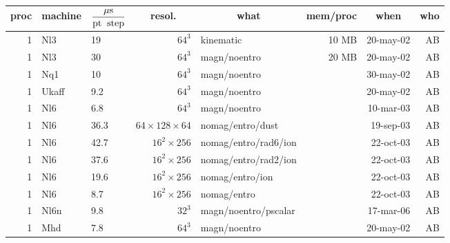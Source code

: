 \documentclass[\mydriver,12pt,twoside,notitlepage,a4paper]{article}
\newcommand{\mcc}[1]{\multicolumn{1}{c}{#1}}
\begin{document}
\begin{center}
    \begin{footnotesize}
    \begin{longtable}{rllrlrrr}
    \toprule
   \mcc{proc}
     & \mcc{machine}
             & \mcc{$\displaystyle\frac{{\mu\rm s}}{\rm pt\;\;step}$}
                    & \mcc{resol.}
                              & \mcc{what}
                                             & \mcc{mem/proc}
                                                      & \mcc{when}&\mcc{who}\\
    \midrule
   1 & Nl3   &  19  &  $64^3$ & kinematic    &  10 MB & 20-may-02 & AB \\
   1 & Nl3   &  30  &  $64^3$ & magn/noentro &  20 MB & 20-may-02 & AB \\
   1 & Nq1   &  10  &  $64^3$ & magn/noentro &        & 30-may-02 & AB \\
   1 & Ukaff & 9.2  &  $64^3$ & magn/noentro &        & 20-may-02 & AB \\
   1 & Nl6   & 6.8  &  $64^3$ & magn/noentro &        & 10-mar-03 & AB \\
   1 & Nl6   & 36.3 &  $64{\!\times\!}128{\!\times\!}64$
                              & nomag/entro/dust &    & 19-sep-03 & AB \\
   1 & Nl6   & 42.7 & $16^2{\!\times\!}256$
                     & nomag/entro/rad6/ion &        & 22-oct-03 & AB \\
   1 & Nl6   & 37.6 & $16^2{\!\times\!}256$
                     & nomag/entro/rad2/ion &        & 22-oct-03 & AB \\
   1 & Nl6   & 19.6 & $16^2{\!\times\!}256$
                      & nomag/entro/ion &      & 22-oct-03 & AB \\
   1 & Nl6   &  8.7 & $16^2{\!\times\!}256$ & nomag/entro &      & 22-oct-03 & AB \\
   1 & Nl6n  &  9.8 & $32^3$
                    & magn/noentro/pscalar   &        & 17-mar-06 & AB \\
   1 & Mhd   & 7.8  &  $64^3$ & magn/noentro &        & 20-may-02 & AB \\

\end{longtable}
\end{footnotesize}
\end{center}
\end{document}
